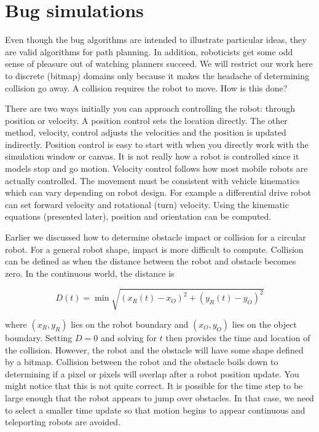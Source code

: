 \hypertarget{bug-simulations}{%
\section{Bug simulations}\label{bug-simulations}}

Even though the bug algorithms are intended to illustrate particular
ideas, they are valid algorithms for path planning. In addition,
roboticists get some odd sense of pleasure out of watching planners
succeed. We will restrict our work here to discrete (bitmap) domains
only because it makes the headache of determining collision go away. A
collision requires the robot to move. How is this done?

There are two ways initially you can approach controlling the robot:
through position or velocity. A position control sets the location
directly. The other method, velocity, control adjusts the velocities and
the position is updated indirectly. Position control is easy to start
with when you directly work with the simulation window or canvas. It is
not really how a robot is controlled since it models stop and go motion.
Velocity control follows how most mobile robots are actually controlled.
The movement must be consistent with vehicle kinematics which can vary
depending on robot design. For example a differential drive robot can
set forward velocity and rotational (turn) velocity. Using the kinematic
equations (presented later), position and orientation can be computed.

Earlier we discussed how to determine obstacle impact or collision for a
circular robot. For a general robot shape, impact is more difficult to
compute. Collision can be defined as when the distance between the robot
and obstacle becomes zero. In the continuous world, the distance is

\[D(t) = \min \sqrt{(x_R(t)-x_O)^2 + (y_R(t)-y_O)^2}\]

where \((x_R,y_R)\) lies on the robot boundary and \((x_O,y_O)\) lies on
the object boundary. Setting \(D=0\) and solving for \(t\) then provides
the time and location of the collision. However, the robot and the
obstacle will have some shape defined by a bitmap. Collision between the
robot and the obstacle boils down to determining if a pixel or pixels
will overlap after a robot position update. You might notice that this
is not quite correct. It is possible for the time step to be large
enough that the robot appears to jump over obstacles. In that case, we
need to select a smaller time update so that motion begins to appear
continuous and teleporting robots are avoided.

